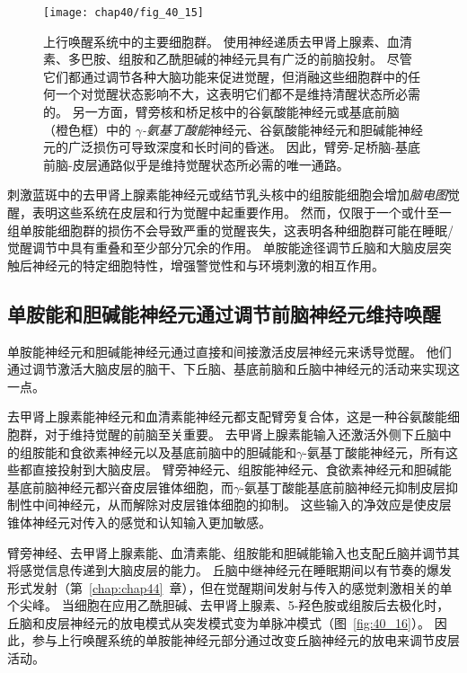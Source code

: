 \begin{figure}[htbp]
	\centering
	\texttt{[image: chap40/fig\_40\_15]}
	\caption{上行唤醒系统中的主要细胞群。
		使用神经递质去甲肾上腺素、血清素、多巴胺、组胺和乙酰胆碱的神经元具有广泛的前脑投射。
		尽管它们都通过调节各种大脑功能来促进觉醒，但消融这些细胞群中的任何一个对觉醒状态影响不大，这表明它们都不是维持清醒状态所必需的。
		另一方面，臂旁核和桥足核中的谷氨酸能神经元或基底前脑（橙色框）中的 \textit{$\gamma$-氨基丁酸能}神经元、谷氨酸能神经元和胆碱能神经元的广泛损伤可导致深度和长时间的昏迷。
		因此，臂旁-足桥脑-基底前脑-皮层通路似乎是维持觉醒状态所必需的唯一通路。}
	\label{fig:40_15}
\end{figure}


刺激蓝斑中的去甲肾上腺素能神经元或结节乳头核中的组胺能细胞会增加\textit{脑电图}觉醒，表明这些系统在皮层和行为觉醒中起重要作用。
然而，仅限于一个或什至一组单胺能细胞群的损伤不会导致严重的觉醒丧失，这表明各种细胞群可能在睡眠/觉醒调节中具有重叠和至少部分冗余的作用。
单胺能途径调节丘脑和大脑皮层突触后神经元的特定细胞特性，增强警觉性和与环境刺激的相互作用。



\subsection{单胺能和胆碱能神经元通过调节前脑神经元维持唤醒}

单胺能神经元和胆碱能神经元通过直接和间接激活皮层神经元来诱导觉醒。
他们通过调节激活大脑皮层的脑干、下丘脑、基底前脑和丘脑中神经元的活动来实现这一点。


去甲肾上腺素能神经元和血清素能神经元都支配臂旁复合体，这是一种谷氨酸能细胞群，对于维持觉醒的前脑至关重要。
去甲肾上腺素能输入还激活外侧下丘脑中的组胺能和食欲素神经元以及基底前脑中的胆碱能和$\gamma$-氨基丁酸能神经元，所有这些都直接投射到大脑皮层。
臂旁神经元、组胺能神经元、食欲素神经元和胆碱能基底前脑神经元都兴奋皮层锥体细胞，而$\gamma$-氨基丁酸能基底前脑神经元抑制皮层抑制性中间神经元，从而解除对皮层锥体细胞的抑制。
这些输入的净效应是使皮层锥体神经元对传入的感觉和认知输入更加敏感。


臂旁神经、去甲肾上腺素能、血清素能、组胺能和胆碱能输入也支配丘脑并调节其将感觉信息传递到大脑皮层的能力。
丘脑中继神经元在睡眠期间以有节奏的爆发形式发射（第~\ref{chap:chap44}~章），但在觉醒期间发射与传入的感觉刺激相关的单个尖峰。
当细胞在应用乙酰胆碱、去甲肾上腺素、5-羟色胺或组胺后去极化时，丘脑和皮层神经元的放电模式从突发模式变为单脉冲模式（图~\ref{fig:40_16}）。
因此，参与上行唤醒系统的单胺能神经元部分通过改变丘脑神经元的放电来调节皮层活动。


